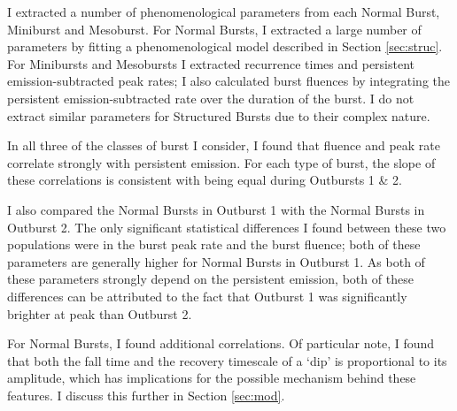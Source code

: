 \par I extracted a number of phenomenological parameters from each Normal Burst, Miniburst and Mesoburst.  For Normal Bursts, I extracted a large number of parameters by fitting a phenomenological model described in Section \ref{sec:struc}.  For Minibursts and Mesobursts I extracted recurrence times and persistent emission-subtracted peak rates; I also calculated burst fluences by integrating the persistent emission-subtracted rate over the duration of the burst.  I do not extract similar parameters for Structured Bursts due to their complex nature.
\par  In all three of the classes of burst I consider, I found that fluence and peak rate correlate strongly with persistent emission.  For each type of burst, the slope of these correlations is consistent with being equal during Outbursts 1 \& 2.
\par I also compared the Normal Bursts in Outburst 1 with the Normal Bursts in Outburst 2.  The only significant statistical differences I found between these two populations were in the burst peak rate and the burst fluence; both of these parameters are generally higher for Normal Bursts in Outburst 1.  As both of these parameters strongly depend on the persistent emission, both of these differences can be attributed to the fact that Outburst 1 was significantly brighter at peak than Outburst 2.
\par For Normal Bursts, I found additional correlations.  Of particular note, I found that both the fall time and the recovery timescale of a `dip' is proportional to its amplitude, which has implications for the possible mechanism behind these features.  I discuss this further in Section \ref{sec:mod}.
